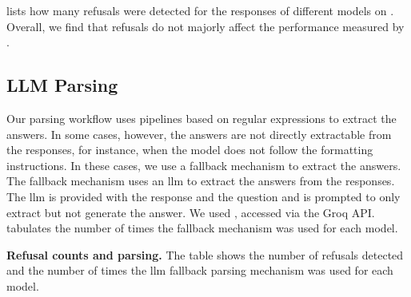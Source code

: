  lists how many refusals were detected for the responses of different models on \chembench. Overall, we find that refusals do not majorly affect the performance measured by \chembench.


\subsection{LLM Parsing} \label{sec:llm-parsing}

Our parsing workflow uses pipelines based on regular expressions to extract the answers. In some cases, however, the answers are not directly extractable from the responses, for instance, when the model does not follow the formatting instructions. In these cases, we use a fallback mechanism to extract the answers. The fallback mechanism uses an \gls{llm} to extract the answers from the responses. The \gls{llm} is provided with the response and the question and is prompted to only extract but not generate the answer. We used \LlamaThreeSeventyBInstruct, accessed via the Groq API.
 tabulates the number of times the fallback mechanism was used for each model.


\begin{table}
    \centering
    \caption{\textbf{Refusal counts and parsing.} The table shows the number of refusals detected and the number of times the \gls{llm} fallback parsing mechanism was used for each model.}
    \label{tab:refusal_counts_and_parsing}
\end{table}

\clearpage
